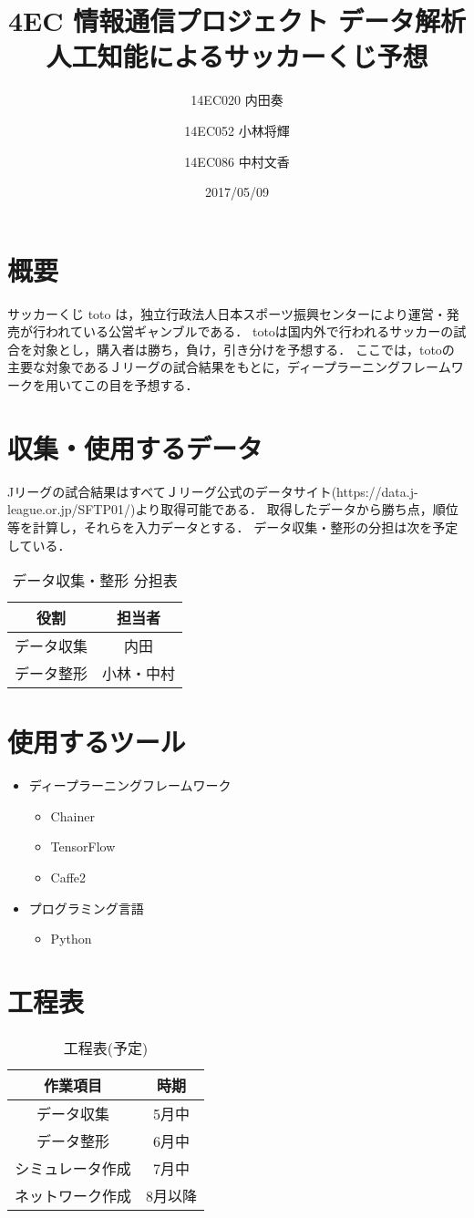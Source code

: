 \documentclass[9pt]{jsarticle}
\title{4EC 情報通信プロジェクト データ解析\\ 人工知能によるサッカーくじ予想}
\date{2017/05/09}
\author{14EC020 内田奏 \and 14EC052 小林将輝 \and 14EC086 中村文香}
\begin{document}
\maketitle
\thispagestyle{fancy}
\section{概要}
サッカーくじ toto は，独立行政法人日本スポーツ振興センターにより運営・発売が行われている公営ギャンブルである．
totoは国内外で行われるサッカーの試合を対象とし，購入者は勝ち，負け，引き分けを予想する．
ここでは，totoの主要な対象であるＪリーグの試合結果をもとに，ディープラーニングフレームワークを用いてこの目を予想する．

\section{収集・使用するデータ}
Jリーグの試合結果はすべてＪリーグ公式のデータサイト(https://data.j-league.or.jp/SFTP01/)より取得可能である．
取得したデータから勝ち点，順位等を計算し，それらを入力データとする．
データ収集・整形の分担は次を予定している．
\begin{table}[htbp]
\centering
\caption{データ収集・整形 分担表} \label{Equipments}
\begin{tabular}{cc} 
\hline
役割&担当者\\\hline\hline
データ収集&内田\\
データ整形&小林・中村\\\hline
\end{tabular}
\end{table}

\section{使用するツール}
\begin{itemize}
\item{ディープラーニングフレームワーク}
\begin{itemize}
\item{Chainer}
\item{TensorFlow}
\item{Caffe2}
\end{itemize}
\item{プログラミング言語}
\begin{itemize}
\item{Python}
\end{itemize}
\end{itemize}

\section{工程表}
\begin{table}[htbp]
\centering
\caption{工程表(予定)} \label{Equipments}
\begin{tabular}{cc} 
\hline
作業項目&時期\\\hline\hline
データ収集&5月中\\
データ整形&6月中\\
シミュレータ作成&7月中\\
ネットワーク作成&8月以降\\\hline
\end{tabular}
\end{table}
\end{document}
